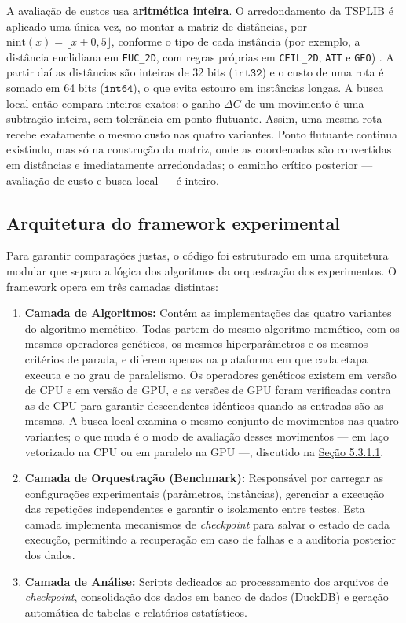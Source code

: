 A avaliação de custos usa \textbf{aritmética inteira}. O arredondamento da TSPLIB é aplicado uma única vez, ao montar a matriz de distâncias, por \(\text{nint}(x) = \lfloor x + 0{,}5 \rfloor\), conforme o tipo de cada instância (por exemplo, a distância euclidiana em \texttt{EUC\_2D}, com regras próprias em \texttt{CEIL\_2D}, \texttt{ATT} e \texttt{GEO}) \autocite{reinelt1991tsplib}.
A partir daí as distâncias são inteiras de 32 bits (\(\texttt{int32}\)) e o custo de uma rota é somado em 64 bits (\(\texttt{int64}\)), o que evita estouro em instâncias longas.
A busca local então compara inteiros exatos: o ganho \(\Delta C\) de um movimento é uma subtração inteira, sem tolerância em ponto flutuante.
Assim, uma mesma rota recebe exatamente o mesmo custo nas quatro variantes.
Ponto flutuante continua existindo, mas só na construção da matriz, onde as coordenadas são convertidas em distâncias e imediatamente arredondadas; o caminho crítico posterior — avaliação de custo e busca local — é inteiro.

\subsection{Arquitetura do framework experimental}\label{sec-313-arquitetura-framework}

Para garantir comparações justas, o código foi estruturado em uma arquitetura modular que separa a lógica dos algoritmos da orquestração dos experimentos.
O framework opera em três camadas distintas:

\begin{enumerate}
  \def\labelenumi{\arabic{enumi}.}
  \tightlist
  \item
        \textbf{Camada de Algoritmos:} Contém as implementações das quatro variantes do algoritmo memético.
        Todas partem do mesmo algoritmo memético, com os mesmos operadores genéticos, os mesmos hiperparâmetros e os mesmos critérios de parada, e diferem apenas na plataforma em que cada etapa executa e no grau de paralelismo.
        Os operadores genéticos existem em versão de CPU e em versão de GPU, e as versões de GPU foram verificadas contra as de CPU para garantir descendentes idênticos quando as entradas são as mesmas.
        A busca local examina o mesmo conjunto de movimentos nas quatro variantes; o que muda é o modo de avaliação desses movimentos --- em laço vetorizado na CPU ou em paralelo na GPU ---, discutido na \hyperref[sec-5311-semantica-operadores]{Seção 5.3.1.1}.
  \item
        \textbf{Camada de Orquestração (Benchmark):} Responsável por carregar as configurações experimentais (parâmetros, instâncias), gerenciar a execução das repetições independentes e garantir o isolamento entre testes.
        Esta camada implementa mecanismos de \emph{checkpoint} para salvar o estado de cada execução, permitindo a recuperação em caso de falhas e a auditoria posterior dos dados.
  \item
        \textbf{Camada de Análise:} Scripts dedicados ao processamento dos arquivos de \emph{checkpoint}, consolidação dos dados em banco de dados (DuckDB) e geração automática de tabelas e relatórios estatísticos.
\end{enumerate}

